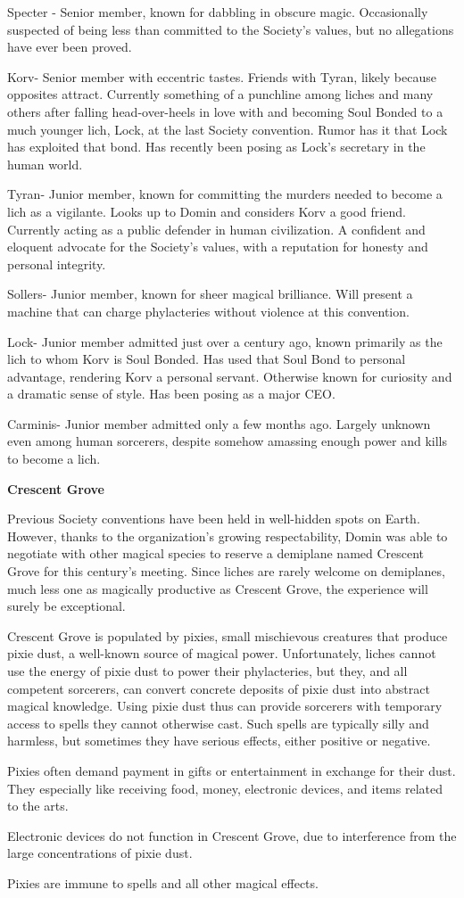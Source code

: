 \documentclass[blue]{Sel}
\begin{document}
Specter - Senior member, known for dabbling in obscure magic. Occasionally suspected of being less than committed to the Society’s values, but no allegations have ever been proved.

Korv- Senior member with eccentric tastes. Friends with Tyran, likely because opposites attract. Currently something of a punchline among liches and many others after falling head-over-heels in love with and becoming Soul Bonded to a much younger lich, Lock, at the last Society convention. Rumor has it that Lock has exploited that bond. Has recently been posing as Lock’s secretary in the human world.

Tyran- Junior member, known for committing the murders needed to become a lich as a vigilante. Looks up to Domin and considers Korv a good friend. Currently acting as a public defender in human civilization. A confident and eloquent advocate for the Society’s values, with a reputation for honesty and personal integrity.

Sollers- Junior member, known for sheer magical brilliance. Will present a machine that can charge phylacteries without violence at this convention. 

Lock- Junior member admitted just over a century ago, known primarily as the lich to whom Korv is Soul Bonded. Has used that Soul Bond to personal advantage, rendering Korv a personal servant. Otherwise known for curiosity and a dramatic sense of style. Has been posing as a major CEO.

Carminis- Junior member admitted only a few months ago. Largely unknown even among human sorcerers, despite somehow amassing enough power and kills to become a lich.


\textbf{Crescent Grove}

Previous Society conventions have been held in well-hidden spots on Earth. However, thanks to the organization’s growing respectability, Domin was able to negotiate with other magical species to reserve a demiplane named Crescent Grove for this century’s meeting. Since liches are rarely welcome on demiplanes, much less one as magically productive as Crescent Grove, the experience will surely be exceptional.

Crescent Grove is populated by pixies, small mischievous creatures that produce pixie dust, a well-known source of magical power. Unfortunately, liches cannot use the energy of pixie dust to power their phylacteries, but they, and all competent sorcerers, can convert concrete deposits of pixie dust into abstract magical knowledge. Using pixie dust thus can provide sorcerers with temporary access to spells they cannot otherwise cast. Such spells are typically silly and harmless, but sometimes they have serious effects, either positive or negative.

Pixies often demand payment in gifts or entertainment in exchange for their dust. They especially like receiving food, money, electronic devices, and items related to the arts.

Electronic devices do not function in Crescent Grove, due to interference from the large concentrations of pixie dust.

Pixies are immune to spells and all other magical effects.
\end{document}
